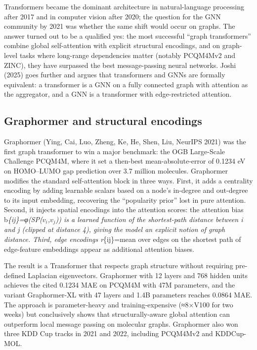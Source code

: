 Transformers became the dominant architecture in natural-language processing after 2017 and in computer vision after 2020; the question for the GNN community by 2021 was whether the same shift would occur on graphs. The answer turned out to be a qualified yes: the most successful ``graph transformers'' combine global self-attention with explicit structural encodings, and on graph-level tasks where long-range dependencies matter (notably PCQM4Mv2 and ZINC), they have surpassed the best message-passing neural networks. Joshi (2025) goes further and argues that transformers and GNNs are formally equivalent: a transformer is a GNN on a fully connected graph with attention as the aggregator, and a GNN is a transformer with edge-restricted attention.

\subsection{Graphormer and structural encodings}\label{graphormer-and-structural-encodings}

Graphormer (Ying, Cai, Luo, Zheng, Ke, He, Shen, Liu, NeurIPS 2021) was the first graph transformer to win a major benchmark: the OGB Large-Scale Challenge PCQM4M, where it set a then-best mean-absolute-error of 0.1234 eV on HOMO--LUMO gap prediction over 3.7 million molecules. Graphormer modifies the standard self-attention block in three ways. First, it adds a centrality encoding by adding learnable scalars based on a node's in-degree and out-degree to its input embedding, recovering the ``popularity prior'' lost in pure attention. Second, it injects spatial encodings into the attention scores: the attention bias b\emph{\{ij\}=φ(SP(\(v_i\),\(v_j\))) is a learned function of the shortest-path distance between i and j (clipped at distance 4), giving the model an explicit notion of graph distance. Third, edge encodings r}\{ij\}=mean over edges on the shortest path of edge-feature embeddings appear as additional attention biases.

The result is a Transformer that respects graph structure without requiring pre-defined Laplacian eigenvectors. Graphormer with 12 layers and 768 hidden units achieves the cited 0.1234 MAE on PCQM4M with 47M parameters, and the variant Graphormer-XL with 47 layers and 1.4B parameters reaches 0.0864 MAE. The approach is parameter-heavy and training-expensive (≈8×V100 for two weeks) but conclusively shows that structurally-aware global attention can outperform local message passing on molecular graphs. Graphormer also won three KDD Cup tracks in 2021 and 2022, including PCQM4Mv2 and KDDCup-MOL.

